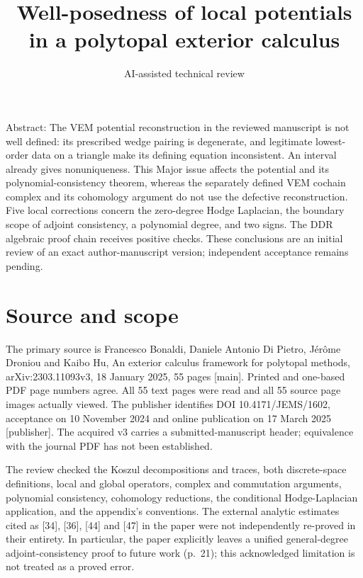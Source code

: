 \documentclass[10pt]{article}
\title{Well-posedness of local potentials
in a polytopal exterior calculus}
\author{AI-assisted technical review}
\date{}
\begin{document}
\maketitle
Abstract: The VEM potential reconstruction in the reviewed manuscript is not well defined: its prescribed wedge pairing is degenerate, and legitimate lowest-order data on a triangle make its defining equation inconsistent. An interval already gives nonuniqueness. This Major issue affects the potential and its polynomial-consistency theorem, whereas the separately defined VEM cochain complex and its cohomology argument do not use the defective reconstruction. Five local corrections concern the zero-degree Hodge Laplacian, the boundary scope of adjoint consistency, a polynomial degree, and two signs. The DDR algebraic proof chain receives positive checks. These conclusions are an initial review of an exact author-manuscript version; independent acceptance remains pending.\par
\section*{Source and scope}
The primary source is Francesco Bonaldi, Daniele Antonio Di Pietro, Jérôme Droniou and Kaibo Hu, An exterior calculus framework for polytopal methods, arXiv:2303.11093v3, 18 January 2025, 55 pages [main]. Printed and one-based PDF page numbers agree. All 55 text pages were read and all 55 source page images actually viewed. The publisher identifies DOI 10.4171/JEMS/1602, acceptance on 10 November 2024 and online publication on 17 March 2025 [publisher]. The acquired v3 carries a submitted-manuscript header; equivalence with the journal PDF has not been established.\par
The review checked the Koszul decompositions and traces, both discrete-space definitions, local and global operators, complex and commutation arguments, polynomial consistency, cohomology reductions, the conditional Hodge-Laplacian application, and the appendix’s conventions. The external analytic estimates cited as [34], [36], [44] and [47] in the paper were not independently re-proved in their entirety. In particular, the paper explicitly leaves a unified general-degree adjoint-consistency proof to future work (p. 21); this acknowledged limitation is not treated as a proved error.\par
\end{document}
